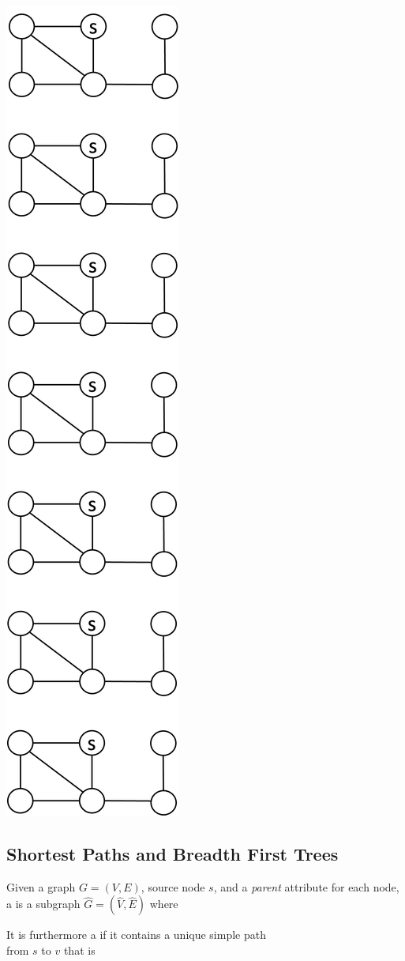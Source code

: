 \documentclass[11  pt]{exam}
\begin{document}
	\includegraphics[width = .35\linewidth]{graphs2.png}
	
	\subsection{Shortest Paths and Breadth First Trees}
	\begin{definition}
		Given a graph $G = (V,E)$, source node $s$, and a \emph{parent} attribute for each node, a  is a subgraph $\hat{G} = (\hat{V}, \hat{E})$ where
		
		\vs{3cm}
		
		It is furthermore a  if it contains a unique simple path \\
		
		from $s$ to $v$ that is  \\
	\end{definition}
	
\end{document}
